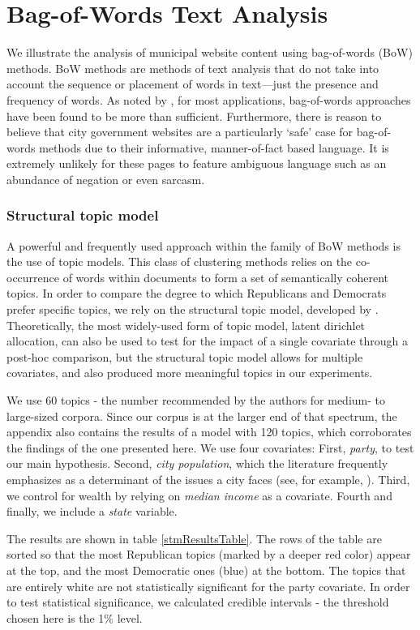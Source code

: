 \documentclass[11pt]{article}
\begin{document}
\section{Bag-of-Words Text Analysis}

We illustrate the analysis of municipal website content using bag-of-words (BoW) methods. BoW methods are methods of text analysis that do not take into account the sequence or placement of words in text---just the presence and frequency of words. As noted by \cite{GrimmerStewart2013}, for most applications, bag-of-words approaches have been found to be more than sufficient. Furthermore, there is reason to believe that city government websites are a particularly `safe' case for bag-of-words methods due to their informative, manner-of-fact based language. It is extremely unlikely for these pages to feature ambiguous language such as an abundance of negation or even sarcasm.

\subsubsection{Structural topic model}
A powerful and frequently used approach within the family of BoW methods is the use of topic models. This class of clustering methods relies on the co-occurrence of words within documents to form a set of semantically coherent topics. In order to compare the degree to which Republicans and Democrats prefer specific topics, we rely on the structural topic model, developed by \citep{Roberts2014}. Theoretically, the most widely-used form of topic model, latent dirichlet allocation, can also be used to test for the impact of a single covariate through a post-hoc comparison, but the structural topic model allows for multiple covariates, and also produced more meaningful topics in our experiments.

We use 60 topics - the number recommended by the authors for medium- to large-sized corpora. Since our corpus is at the larger end of that spectrum, the appendix also contains the results of a model with 120 topics, which corroborates the findings of the one presented here. We use four covariates: First, \textit{party}, to test our main hypothesis. Second, \textit{city population}, which the literature frequently emphasizes as a determinant of the issues a city faces (see, for example, \cite{Guillamon2013}). Third, we control for wealth by relying on \textit{median income} as a covariate. Fourth and finally, we include a \textit{state} variable.

The results are shown in table \ref{stmResultsTable}. The rows of the table are sorted so that the most Republican topics (marked by a deeper red color) appear at the top, and the most Democratic ones (blue) at the bottom. The topics that are entirely white are not statistically significant for the party covariate. In order to test statistical significance, we calculated credible intervals - the threshold chosen here is the 1\% level.
\end{document}
